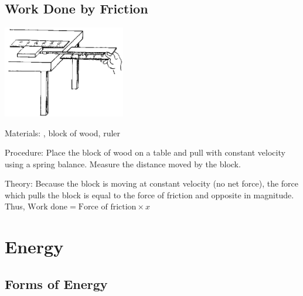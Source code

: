 \begin{multicols}{2}
\subsection{Work Done by Friction}

\begin{center}
\includegraphics[width=0.4\textwidth]{./img/source/work-friction.png}
\end{center}

\begin{description*}
\item[Materials:]{, block of wood, ruler}
\item[Procedure:]{Place the block of wood on a table and pull with constant velocity using a spring balance. Measure the distance moved by the block.}
\item[Theory:]{Because the block is moving at constant velocity (no net force), the force which pulls the block is equal to the force of friction and opposite in magnitude. Thus, $\text{Work done} = \text{Force of friction} \times x$}
\end{description*}


\section*{Energy}


\subsection{Forms of Energy}


\end{multicols}
